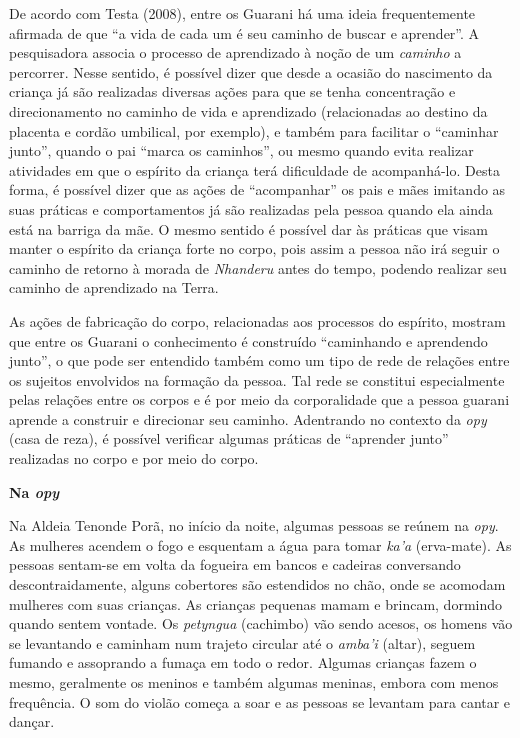 De acordo com Testa (2008), entre os Guarani há uma ideia frequentemente
afirmada de que ``a vida de cada um é seu caminho de buscar e
aprender''. A pesquisadora associa o processo de aprendizado à noção de
um \emph{caminho} a percorrer. Nesse sentido, é possível dizer que desde
a ocasião do nascimento da criança já são realizadas diversas ações para
que se tenha concentração e direcionamento no caminho de vida e
aprendizado (relacionadas ao destino da placenta e cordão umbilical, por
exemplo), e também para facilitar o ``caminhar junto'', quando o pai
``marca os caminhos'', ou mesmo quando evita realizar atividades em que
o espírito da criança terá dificuldade de acompanhá-lo. Desta forma, é
possível dizer que as ações de ``acompanhar'' os pais e mães imitando as
suas práticas e comportamentos já são realizadas pela pessoa quando ela
ainda está na barriga da mãe. O mesmo sentido é possível dar às práticas
que visam manter o espírito da criança forte no corpo, pois assim a
pessoa não irá seguir o caminho de retorno à morada de \emph{Nhanderu}
antes do tempo, podendo realizar seu caminho de aprendizado na Terra.

As ações de fabricação do corpo, relacionadas aos processos do espírito,
mostram que entre os Guarani o conhecimento é construído ``caminhando e
aprendendo junto'', o que pode ser entendido também como um tipo de rede
de relações entre os sujeitos envolvidos na formação da pessoa. Tal rede
se constitui especialmente pelas relações entre os corpos e é por meio
da corporalidade que a pessoa guarani aprende a construir e direcionar
seu caminho. Adentrando no contexto da \emph{opy} (casa de reza), é
possível verificar algumas práticas de ``aprender junto'' realizadas no
corpo e por meio do corpo.

\textbf{Na \emph{opy}}

Na Aldeia Tenonde Porã, no início da noite, algumas pessoas se reúnem na
\emph{opy}. As mulheres acendem o fogo e esquentam a água para tomar
\emph{ka'a} (erva-mate). As pessoas sentam-se em volta da fogueira em
bancos e cadeiras conversando descontraidamente, alguns cobertores são
estendidos no chão, onde se acomodam mulheres com suas crianças. As
crianças pequenas mamam e brincam, dormindo quando sentem vontade. Os
\emph{petyngua} (cachimbo) vão sendo acesos, os homens vão se levantando
e caminham num trajeto circular até o \emph{amba'i} (altar), seguem
fumando e assoprando a fumaça em todo o redor. Algumas crianças fazem o
mesmo, geralmente os meninos e também algumas meninas, embora com menos
frequência. O som do violão começa a soar e as pessoas se levantam para
cantar e dançar.

